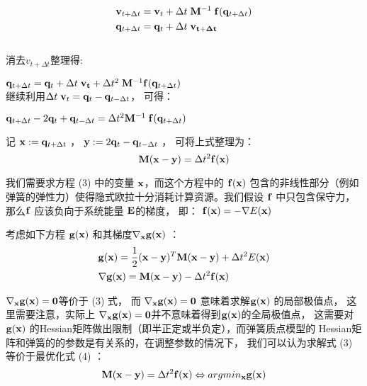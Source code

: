 \documentclass[]{ctexart}
\begin{document}
\begin{equation} \begin{aligned} &\bold{v}_{t+\Delta t} = \bold{v}_t + 
	\Delta t \; \bold{M}^{-1} \; \bold{f}(\bold{q}_{t + \Delta t})\\ &
	\bold{q}_{t+\Delta t} = \bold{q}_t + \Delta t \; \bold{v_{t + \Delta t}} 
\end{aligned} \end{equation}\\
消去$v_{t + \Delta t}$整理得:

$\bold{q}_{t+\Delta t} = \bold{q}_t + \Delta t \; 
\bold{v_{t}} + \Delta t^2 \; \bold{M}^{-1} 
\bold{f}(\bold{q}_{t+\Delta t}) $\\
继续利用$ \Delta t \; \bold{v}_t = \bold{q}_t - \bold{q}_{t - \Delta{t}} $，
可得：

$\bold{q}_{t + \Delta t} - 2 \bold{q}_{t} + \bold{q}_{t - \Delta t} = \Delta t^{2} \bold{M}^{-1}\; \bold{f}(\bold{q}_{t+\Delta t}) $

记 $\bold{x} :=\bold{q}_{t+\Delta t}$ ， $\bold{y} := 2 \bold{q}_{t} -\bold{q}_{t - \Delta t}$ ，
可将上式整理为：
\begin{equation} \bold{M}(\bold{x} - \bold{y}) = \Delta t^2 \bold{f}(\bold{x})\end{equation}

我们需要求方程 (3) 中的变量 $\bold{x}$，而这个方程中的 $\bold{f}(\bold{x}) $
包含的非线性部分（例如弹簧的弹性力）使得隐式欧拉十分消耗计算资源。我们假设
 $\bold{f}$ 中只包含保守力，那么$ \bold{f}$ 应该负向于系统能量
 $\bold{E} $的梯度，
即： $\bold{f}(\bold{x}) = -\nabla E(\bold{x}) $

考虑如下方程 $\bold{g}(\bold{x})$ 和其梯度$ \nabla_{\bold{x}} \bold{g}(\bold{x})$ ：
\begin{equation} \begin{aligned} &\bold{g}(\bold{x}) = \frac{1}{2}(\bold{x}-
	\bold{y})^{T}\bold{M}(\bold{x}-\bold{y}) + \Delta t^2E(\bold{x})\\ &\nabla\bold{g}(\bold{x})
	=\bold{M}(\bold{x}-\bold{y}) - \Delta t^2\bold{f}(\bold{x}) \end{aligned} \end{equation} 

$ \nabla_{\bold{x}}\bold{g}(\bold{x}) = \bold{0} $等价于 (3) 式，
而 $\nabla_{\bold{x}}\bold{g}(\bold{x}) = \bold{0}$ 意味着求解$ \bold{g}(\bold{x})$ 的局部极值点，
这里需要注意，实际上 $\nabla_{\bold{x}}\bold{g}(\bold{x}) = \bold{0} $并不意味着得到$ \bold{g}(\bold{x}) $的全局极值点，
这需要对$\bold{g}(\bold{x})$ 的Hessian矩阵做出限制（即半正定或半负定），而弹簧质点模型的
Hessian矩阵和弹簧的的参数是有关系的，在调整参数的情况下，
我们可以认为求解式 (3) 等价于最优化式 (4) ：
\begin{equation}\bold{M}(\bold{x} - \bold{y}) = \Delta t^2 \bold{f}(\bold{x}) \Leftrightarrow 
	argmin_{\bold{x}} \bold{g}(\bold{x})  \end{equation} 
\end{document}
